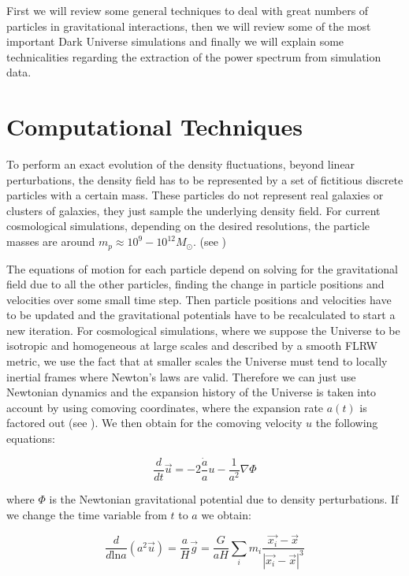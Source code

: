 First we will review some general techniques to deal with great numbers
of particles in gravitational interactions, then we will review some
of the most important Dark Universe simulations and finally we will
explain some technicalities regarding the extraction of the power
spectrum from simulation data. 


\section{Computational Techniques}

To perform an exact evolution of the density fluctuations, beyond
linear perturbations, the density field has to be represented by a
set of fictitious discrete particles with a certain mass. These particles
do not represent real galaxies or clusters of galaxies, they just
sample the underlying density field. For current cosmological simulations,
depending on the desired resolutions, the particle masses are around
$m_{p}\approx10^{9}-10^{12}M_{\odot}$. (see \citet{kuhlen_numerical_2012})

The equations of motion for each particle depend on solving for the
gravitational field due to all the other particles, finding the change
in particle positions and velocities over some small time step. Then
particle positions and velocities have to be updated and the gravitational
potentials have to be recalculated to start a new iteration. For cosmological
simulations, where we suppose the Universe to be isotropic and homogeneous
at large scales and described by a smooth FLRW metric, we use the
fact that at smaller scales the Universe must tend to locally inertial
frames where Newton's laws are valid. Therefore we can just use Newtonian
dynamics and the expansion history of the Universe is taken into account
by using comoving coordinates, where the expansion rate $a(t)$ is
factored out (see \citet{peacock_cosmological_1999,dehnen_n-body_2011}).
We then obtain for the comoving velocity $u$ the following equations:

\begin{equation}
\frac{d}{dt}\vec{u}=-2\frac{\dot{a}}{a}u-\frac{1}{a^{2}}\nabla\Phi
\end{equation}


where $\Phi$ is the Newtonian gravitational potential due to density
perturbations. If we change the time variable from $t$ to $a$ we
obtain:

\begin{equation}
\frac{d}{d\mbox{ln}a}(a^{2}\vec{u})=\frac{a}{H}\vec{g}=\frac{G}{aH}\sum_{i}m_{i}\frac{\vec{x_{i}}-\vec{x}}{\left|\vec{x_{i}}-\vec{x}\right|^{3}}
\end{equation}


